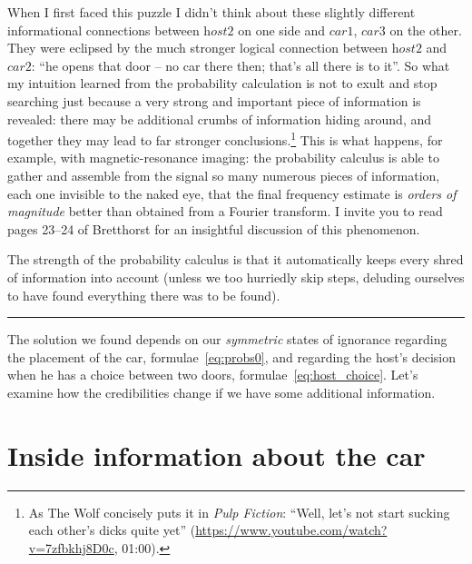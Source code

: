 \documentclass[\ifafour a4paper,12pt,\else a5paper,10pt,\fi%
onecolumn,oneside,article,%
british%
]{memoir}
\theoremstyle{remark}
\theoremstyle{innote}
\newcommand*{\citey}{\parencites*}
\renewcommand*{\|}{\nonscript\,\vert\nonscript\;\mathopen{}}
\newcommand*{\cara}{\textit{car1}}
\newcommand*{\carb}{\textit{car2}}
\newcommand*{\carc}{\textit{car3}}
\newcommand*{\hostb}{\textit{host2}}
\begin{document}
When I first faced this puzzle I didn't think about these slightly
different informational connections between $\hostb$ on one side and
$\cara$, $\carc$ on the other. They were eclipsed by the much stronger
logical connection between $\hostb$ and $\carb$: \enquote{he opens that
  door -- no car there then; that's all there is to it}. So what my
intuition learned from the probability calculation is not to exult and stop
searching just because a very strong and important piece of information is
revealed: there may be additional crumbs of information hiding around, and
together they may lead to far stronger conclusions.\footnote{As The Wolf
  concisely puts it in \emph{Pulp Fiction}: \enquote{Well, let's not start
    sucking each other's dicks quite yet}
  (\url{https://www.youtube.com/watch?v=7zfbkhj8D0c}, 01:00).} This is what
happens, for example, with magnetic-resonance imaging: the probability
calculus is able to gather and assemble from the signal so many numerous
pieces of information, each one invisible to the naked eye, that the final
frequency estimate is \emph{orders of magnitude} better than obtained from
a Fourier transform. I invite you to read pages 23--24 of Bretthorst
\citey{bretthorst1988} for an insightful discussion of this phenomenon.

The strength of the probability calculus is that it automatically keeps
every shred of information into account (unless we too hurriedly skip
steps, deluding ourselves to have found everything there was to be found).


\clearpage

\fancybreak*{*\quad*\quad*}

The solution we found depends on our \emph{symmetric} states of ignorance
regarding the placement of the car, formulae~\eqref{eq:probs0}, and
regarding the host's decision when he has a choice between two doors,
formulae~\eqref{eq:host_choice}. Let's examine how the credibilities change
if we have some additional information.


\section{Inside information about the car}
\label{sec:inside_info_car}
\end{document}
